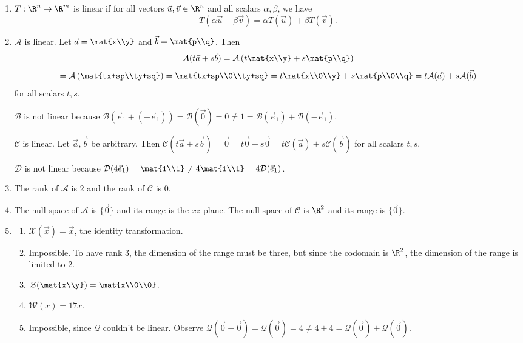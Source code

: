 		\begin{enumerate}
		\item $T:\R^n\to\R^m$ is linear if for all vectors $\vec u,\vec v\in \R^n$ and all
			scalars $\alpha,\beta$, we have
			\[
				T(\alpha\vec u+\beta\vec v)=\alpha T(\vec u)+\beta T(\vec v).
			\]
		\item $\mathcal A$ is linear. Let $\vec a=\mat{x\\y}$ and $\vec b=\mat{p\\q}$. Then
			\[
				\mathcal A(t\vec a+s\vec b) =
				\mathcal A\left(t\mat{x\\y}+s\mat{p\\q}\right)\]\[=
				\mathcal A\left(\mat{tx+sp\\ty+sq}\right)=\mat{tx+sp\\0\\ty+sq}
				=t\mat{x\\0\\y}+s\mat{p\\0\\q}=t\mathcal A(\vec a)+s\mathcal A(\vec b)
			\]
			for all scalars $t,s$.
			
			$\mathcal B$ is not linear because $\mathcal B(\vec e_1+(-\vec e_1)) = \mathcal B(\vec 0)=0\neq
			1=\mathcal B(\vec e_1)+\mathcal B(-\vec e_1)$.

			$\mathcal C$ is linear. Let $\vec a,\vec b$ be arbitrary. Then $\mathcal C(t\vec a+s\vec b)=
			\vec 0=t\vec 0+s\vec 0=t\mathcal C(\vec a)+s\mathcal C(\vec b)$ for all scalars $t,s$.

			$\mathcal D$ is not linear because $\mathcal D(4\vec e_1) = \mat{1\\1}\neq 4\mat{1\\1} = 4\mathcal D(\vec e_1)$.

		\item The rank of $\mathcal A$ is 2  and the rank of $\mathcal C$ is 0.
		\item The null space of $\mathcal A$ is $\{\vec 0\}$ and its range is the $xz$-plane. The null space of $\mathcal C$ is
			$\R^2$ and its range is $\{\vec 0\}$.

		\item \begin{enumerate}
			\item $\mathcal X(\vec x)=\vec x$, the identity transformation.
			\item Impossible. To have rank $3$, the dimension of the range must be three, but since the codomain
				is $\R^2$, the dimension of the range is limited to $2$.
			\item $\mathcal Z(\mat{x\\y}) = \mat{x\\0\\0}$.
			\item $\mathcal W(x)=17x$.
			\item Impossible, since $\mathcal Q$ couldn't be linear. Observe $\mathcal Q(\vec 0+\vec 0)=
				\mathcal Q(\vec 0)=4\neq 4+4=\mathcal Q(\vec 0)+\mathcal Q(\vec 0)$.
		\end{enumerate}

		\end{enumerate}